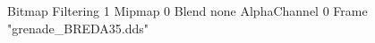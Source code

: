 {Bitmap
	{Filtering 1}
	{Mipmap 0}
	{Blend none}
	{AlphaChannel 0}
	{Frame "grenade_BREDA35.dds"}
}
